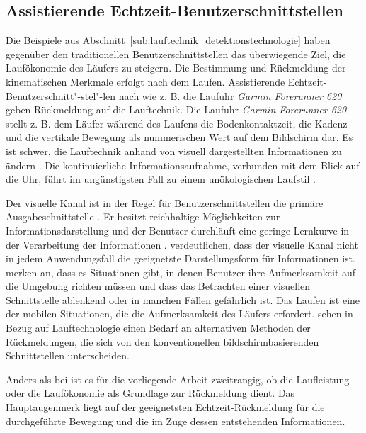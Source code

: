 \subsection{Assistierende Echtzeit-Benutzerschnittstellen}
\label{sub:assistierende_echtzeit_benutzerschnittstellen}

Die Beispiele aus Abschnitt~\ref{sub:lauftechnik_detektionstechnologie} haben gegenüber den traditionellen Benutzerschnittstellen das überwiegende Ziel, die Laufökonomie des Läufers zu steigern. Die Bestimmung und Rückmeldung der kinematischen Merkmale erfolgt nach dem Laufen. Assistierende Echtzeit-Benutzerschnitt"-stel"-len nach \citet{Jensen2014} wie z. B. die Laufuhr \emph{Garmin Forerunner 620} geben Rückmeldung auf die Lauftechnik. Die Laufuhr \emph{Garmin Forerunner 620} stellt z. B. dem Läufer während des Laufens die Bodenkontaktzeit, die Kadenz und die vertikale Bewegung als nummerischen Wert auf dem Bildschirm dar. Es ist schwer, die Lauftechnik anhand von visuell dargestellten Informationen zu ändern \citep[vgl.][]{Jensen2014}. Die kontinuierliche Informationsaufnahme, verbunden mit dem Blick auf die Uhr, führt im ungünstigsten Fall zu einem unökologischen Laufstil \citep[vgl.][]{Jensen2014}.

Der visuelle Kanal ist in der Regel für Benutzerschnittstellen die primäre Ausgabeschnittstelle \citep[vgl.][]{Jensen2014}. Er besitzt reichhaltige Möglichkeiten zur Informationsdarstellung und der Benutzer durchläuft eine geringe Lernkurve in der Verarbeitung der Informationen \citep[vgl.][]{Jensen2014}. \citet[][]{Jensen2014} verdeutlichen, dass der visuelle Kanal nicht in jedem Anwendungsfall die geeignetste Darstellungsform für Informationen ist. \citet[][]{Zhao2007} merken an, dass es Situationen gibt, in denen Benutzer ihre Aufmerksamkeit auf die Umgebung richten müssen und dass das Betrachten einer visuellen Schnittstelle ablenkend oder in manchen Fällen gefährlich ist. Das Laufen ist eine der mobilen Situationen, die die Aufmerksamkeit des Läufers erfordert. \citet[][]{Jensen2014} sehen in Bezug auf Lauftechnologie einen Bedarf an alternativen Methoden der Rückmeldungen, die sich von den konventionellen bildschirmbasierenden Schnittstellen unterscheiden.

Anders als bei \citet[][]{Jensen2014} ist es für die vorliegende Arbeit zweitrangig, ob die Laufleistung oder die Laufökonomie als Grundlage zur Rückmeldung dient. Das Hauptaugenmerk liegt auf der geeignetsten Echtzeit-Rückmeldung für die durchgeführte Bewegung und die im Zuge dessen entstehenden Informationen.

